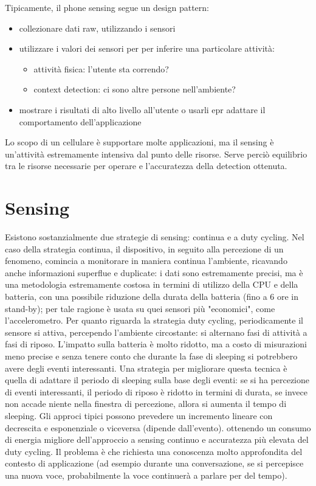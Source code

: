 Tipicamente, il phone sensing segue un design pattern:
\begin{itemize}
\item collezionare dati raw, utilizzando i sensori
\item utilizzare i valori dei sensori per per inferire una particolare
attività:
\begin{itemize}
\item attività fisica: l'utente sta correndo?
\item context detection: ci sono altre persone nell'ambiente?
\end{itemize}
\item mostrare i risultati di alto livello all'utente o usarli epr adattare il
comportamento dell'applicazione
\end{itemize}

Lo scopo di un cellulare è supportare molte applicazioni, ma il sensing è
un'attività estremamente intensiva dal punto delle risorse. Serve perciò
equilibrio tra le risorse necessarie per operare e l'accuratezza della detection
ottenuta.

\section{Sensing}
Esistono sostanzialmente due strategie di sensing: continua e a duty cycling.
Nel caso della strategia continua, il dispositivo, in seguito alla percezione di
un fenomeno, comincia a monitorare in maniera continua l'ambiente, ricavando
anche informazioni superflue e duplicate: i dati sono estremamente precisi, ma è
una metodologia estremamente costosa in termini di utilizzo della CPU e della
batteria, con una possibile riduzione della durata della batteria (fino a 6 ore
in stand-by); per tale ragione è usata su quei sensori più "economici", come
l'accelerometro.
Per quanto riguarda la strategia duty cycling, periodicamente il sensore si
attiva, percependo l'ambiente circostante: si alternano fasi di attività a fasi
di riposo. L'impatto sulla batteria è molto ridotto, ma a costo di misurazioni
meno precise e senza tenere conto che durante la fase di sleeping si potrebbero
avere degli eventi interessanti.
Una strategia per migliorare questa tecnica è quella di adattare il periodo di
sleeping sulla base degli eventi: se si ha percezione di eventi interessanti, il
periodo di riposo è ridotto in termini di durata, se invece non accade niente
nella finestra di percezione, allora si aumenta il tempo di sleeping.
Gli approci tipici possono prevedere un incremento lineare con decrescita e
esponenziale o viceversa (dipende dall'evento). ottenendo un consumo di energia
migliore dell'approccio a sensing continuo e accuratezza più elevata del duty
cycling.
Il problema è che richiesta una conoscenza molto approfondita del contesto di
applicazione (ad esempio durante una conversazione, se si percepisce una nuova
voce, probabilmente la voce continuerà a parlare per del tempo).

